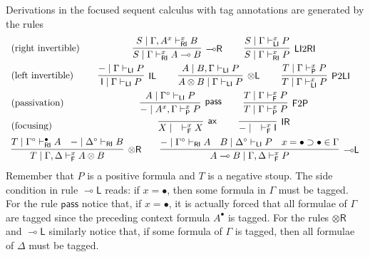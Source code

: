 \documentclass[copyright,creativecommons]{eptcs}
\theoremstyle{definition}
\newcommand{\tl}{\otimes \mathsf{L}}
\newcommand{\tr}{\otimes \mathsf{R}}
\newcommand{\lright}{{\multimap}\mathsf{R}}
\newcommand{\lleft}{{\multimap}\mathsf{L}}
\newcommand{\pass}{\mathsf{pass}}
\newcommand{\unitl}{\mathsf{IL}}
\newcommand{\unitr}{\mathsf{IR}}
\newcommand{\ax}{\mathsf{ax}}
\newcommand{\ot}{\otimes}
\newcommand{\lolli}{\multimap}
\newcommand{\I}{\mathsf{I}}
\newcommand{\RI}{\mathsf{RI}}
\newcommand{\LI}{\mathsf{LI}}
\newcommand{\Pass}{\mathsf{P}}
\newcommand{\F}{\mathsf{F}}
\newcommand{\xvdash}{\vdash^{x}}
\newcommand{\proofbox}[1]{\begin{tabular}{l} #1 \end{tabular}}
\begin{document}
Derivations in the focused sequent calculus with tag annotations are generated by the rules
\begin{equation}\label{eq:focus}
  \begin{array}{lc}
    \text{(right invertible)} & %
    \proofbox{
      \infer[\lright]{S \mid \Gamma \vdash^{x}_{\RI} A \lolli B}{S \mid \Gamma , A^{x} \vdash^{x}_{\RI} B}
    \qquad
    \infer[\LI 2 \RI]{S \mid \Gamma \vdash^{x}_{\RI} P}{S \mid \Gamma \vdash^{x}_{\LI} P}
    }
    \\[10pt]
    \text{(left invertible)} & %
    \proofbox{
      \infer[\unitl]{\I \mid \Gamma \vdash_{\LI} P}{{-} \mid \Gamma \vdash_{\LI} P}
    \qquad
    \infer[\tl]{A \ot B \mid \Gamma \vdash_{\LI} P}{A \mid B , \Gamma \vdash_{\LI} P}
    \qquad
    \infer[\Pass 2 \LI]{T \mid \Gamma \xvdash_{\LI} P}{T \mid \Gamma \xvdash_{\Pass} P}
    }
    \\[10pt]
    \text{(passivation)} &
    \proofbox{
    \infer[\pass]{{-} \mid A^{x} , \Gamma \xvdash_{\Pass} P }{
      A\mid \Gamma^{\circ} \vdash_{\LI} P
    }
    \qquad
    \infer[\F 2 \Pass]{T \mid \Gamma \xvdash_{\Pass} P}{
      T \mid \Gamma \xvdash_{\F} P 
    }
    }
    \\[10pt]
    \text{(focusing)} &    %
    \proofbox{\infer[\ax]{X \mid \quad \xvdash_{\F} X}{}
    \qquad
    \infer[\unitr]{{-} \mid \quad \xvdash_{\F} \I}{}
    }
    \\[6pt]
    \multicolumn{2}{c}{
    \infer[\tr]{T \mid \Gamma , \Delta \xvdash_{\F} A \ot B}{
      T \mid \Gamma^{\circ} \vdash^{\bullet}_{\RI} A
      &
      {-} \mid \Delta^{\circ} \vdash_{\RI} B
    }
    \qquad
    \infer[\lleft]{A \lolli B \mid \Gamma , \Delta \xvdash_{\F} P}{
      {-} \mid \Gamma^{\circ} \vdash_{\RI} A
      &
      B \mid \Delta^{\circ} \vdash_{\LI} P
      &
      x = \bullet \supset \bullet \in \Gamma
    }
    }
  \end{array}
\end{equation}
Remember that $P$ is a positive formula and $T$ is a negative stoup. The side condition in rule $\lleft$ reads: if $x = \bullet$, then some formula in $\Gamma$ must be tagged. For the rule $\pass$ notice that, if $x = \bullet$, it is actually forced that all formulae of $\Gamma$ are tagged since the preceding context formula $A^\bullet$ is tagged. For the rules $\tr$ and $\lleft$ similarly notice that, 
if some formula of $\Gamma$ is tagged, then all formulae of $\Delta$ must be tagged. 
\end{document}
